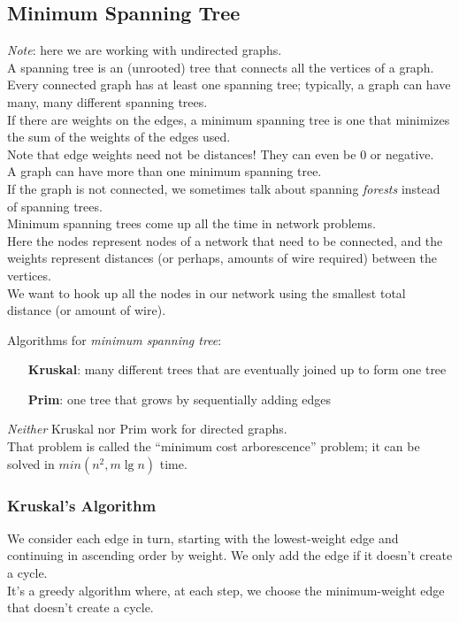 \documentclass[12pt]{article}
\theoremstyle{plain}
\theoremstyle{definition}
\newcommand{\lecture}[1]{\marginpar{{\footnotesize $\leftarrow$ \underline{#1}}}}
\begin{document}
\subsection{Minimum Spanning Tree}
\emph{Note}: here we are working with undirected graphs. \\
A spanning tree is an (unrooted) tree that connects all the vertices of a graph. \\
Every connected graph has at least one spanning tree;
typically, a graph can have many, many different spanning trees. \\
If there are weights on the edges, a minimum spanning tree is one that minimizes the sum of the weights of the edges used. \\
Note that edge weights need not be distances!
They can even be 0 or negative. \\
A graph can have more than one minimum spanning tree. \\

If the graph is not connected, we sometimes talk about spanning \emph{forests} instead of spanning trees. \\

Minimum spanning trees come up all the time in network problems. \\
Here the nodes represent nodes of a network that need to be connected, and the weights represent distances (or perhaps, amounts of wire required) between the vertices. \\
We want to hook up all the nodes in our network using the smallest total distance (or amount of wire). \\

\lecture{2016/11/03}

Algorithms for \emph{minimum spanning tree}:
\begin{itemize}
  \item[\textbf{Kruskal}:] many different trees that are eventually joined up to form one tree
  \item[\textbf{Prim}:] one tree that grows by sequentially adding edges
\end{itemize}

\emph{Neither} Kruskal nor Prim work for directed graphs. \\
That problem is called the ``minimum cost arborescence'' problem;
it can be solved in $min(n^{2}, m\lg{n})$ time.

\subsubsection{Kruskal's Algorithm}
We consider each edge in turn, starting with the lowest-weight edge and continuing in ascending order by weight.
We only add the edge if it doesn't create a cycle. \\
It's a greedy algorithm where, at each step, we choose the minimum-weight edge that doesn't create a cycle. \\
\end{document}
